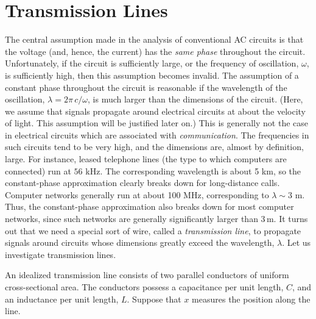 \section{Transmission Lines}\label{strans}
The central assumption made in the analysis of conventional AC circuits is that
the voltage (and, hence,  the current) has the {\em same phase}\/ throughout the circuit. 
Unfortunately, if the circuit is sufficiently large, or the frequency of
oscillation, $\omega$, is sufficiently high, then this assumption becomes invalid. 
The assumption of a constant phase throughout the circuit is reasonable if the 
wavelength of the oscillation, $\lambda = 2\pi \,c/\omega$, is 
much larger than the dimensions of
the circuit. (Here, we assume that signals propagate around electrical circuits
at about the velocity of light. This assumption will be justified later on.)
This is generally not the case in electrical circuits which are
associated with {\em communication}. The frequencies in such
circuits tend to be very high, and the dimensions  are, almost
by definition,  large. For instance,
leased telephone lines (the type to which computers are connected) run at
$56$ kHz. The corresponding wavelength is about 5 km, so the constant-phase
approximation clearly breaks down for long-distance calls. Computer networks
generally run at about 100 MHz, corresponding to $\lambda \sim 3$ m. Thus,
 the constant-phase approximation also breaks down for most computer networks,
since such networks are generally significantly larger than 3\,m.
It turns out that we need a
special sort of wire, called a {\em transmission line}, to propagate signals around circuits
whose dimensions greatly exceed the wavelength, $\lambda$. Let us investigate
transmission lines. 

An idealized transmission line consists of two parallel conductors of uniform
cross-sectional area. 
 The conductors possess a capacitance per unit length,
$C$, and an inductance per unit length, $L$. Suppose that $x$ measures the position
along the line. 

